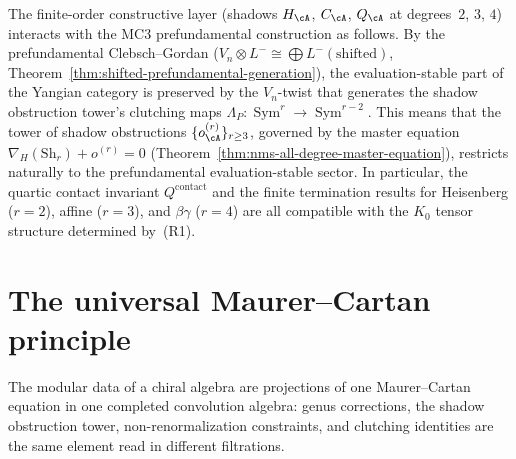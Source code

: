 \begin{remark}
\label{rem:nms-prefundamental-cg}
The finite-order constructive layer (shadows $H_\cA$, $C_\cA$,
$Q_\cA$ at degrees~$2$, $3$, $4$) interacts with the MC3
prefundamental construction as follows. By the prefundamental
Clebsch--Gordan ($V_n \otimes L^- \cong \bigoplus L^-(\text{shifted})$,
Theorem~\ref{thm:shifted-prefundamental-generation}), the
evaluation-stable part of the Yangian category is preserved by the
$V_n$-twist that generates the shadow obstruction tower's clutching maps
$\Lambda_P \colon \operatorname{Sym}^r \to \operatorname{Sym}^{r-2}$.
This means that the tower of shadow obstructions
$\{o^{(r)}_\cA\}_{r \geq 3}$, governed by the master equation
$\nabla_H(\mathrm{Sh}_r) + o^{(r)} = 0$
(Theorem~\ref{thm:nms-all-degree-master-equation}),
restricts naturally to the prefundamental evaluation-stable sector.
In particular, the quartic contact invariant $Q^{\mathrm{contact}}$
and the finite termination results for Heisenberg ($r = 2$),
affine ($r = 3$), and $\beta\gamma$ ($r = 4$) are all compatible
with the $K_0$ tensor structure determined by~(R1).
\end{remark}

\providecommand{\gAmod}{\mathfrak{g}_{\cA}^{\mathrm{mod}}}

\section{The universal Maurer--Cartan principle}
\label{sec:nms-universal-mc-principle}

The modular data of a chiral algebra are projections of one
Maurer--Cartan equation in one completed convolution algebra: genus
corrections, the shadow obstruction tower, non-renormalization
constraints, and clutching identities are the same element read in
different filtrations.

